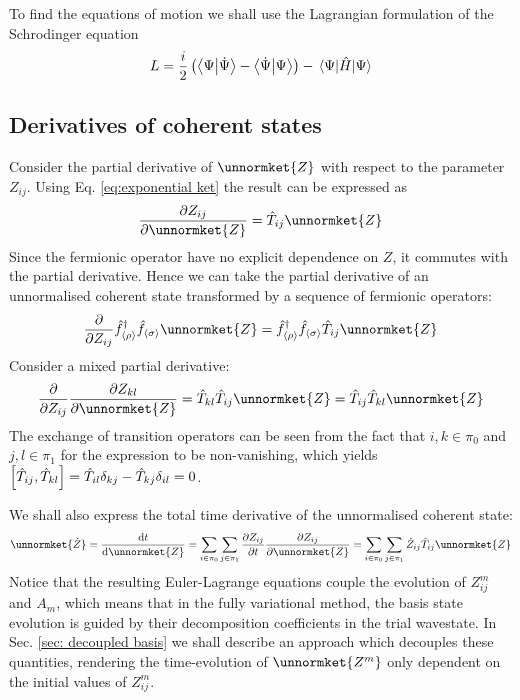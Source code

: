 \documentclass[12pt]{article}
\newcommand{\seq}[1]{\langle #1\rangle}
\newcommand{\hc}{^\dagger}
\begin{document}
	To find the equations of motion we shall use the Lagrangian formulation of the Schrodinger equation
	\begin{equation} \label{eq: schrodinger lagrangian}
	L=\frac{i}{2}\left(\braket{\Psi}{\dot{\Psi}}-\braket{\dot{\Psi}}{\Psi}\right)-\mel{\Psi}{\hat{H}}{\Psi}
	\end{equation}
	
	\subsection{Derivatives of coherent states}
	Consider the partial derivative of $\unnormket{Z}$ with respect to the parameter $Z_{ij}$. Using Eq. \ref{eq:exponential ket} the result can be expressed as
	\begin{equation}
	\pdv{Z_{ij}}\unnormket{Z}=\hat{T}_{ij}\unnormket{Z}
	\end{equation}
	Since the fermionic operator have no explicit dependence on $Z$, it commutes with the partial derivative. Hence we can take the partial derivative of an unnormalised coherent state transformed by a sequence of fermionic operators:
	\begin{equation}
	\pdv{Z_{ij}}\hat{f}\hc_{\seq{\rho}}\hat{f}_{\seq{\sigma}}\unnormket{Z}=\hat{f}\hc_{\seq{\rho}}\hat{f}_{\seq{\sigma}}\hat{T}_{ij}\unnormket{Z}
	\end{equation}
	Consider a mixed partial derivative:
	\begin{equation}
	\pdv{Z_{ij}}\pdv{Z_{kl}}\unnormket{Z}=\hat{T}_{kl}\hat{T}_{ij}\unnormket{Z}=\hat{T}_{ij}\hat{T}_{kl}\unnormket{Z}
	\end{equation}
	 The exchange of transition operators can be seen from the fact that $i,k\in\pi_0$ and $j,l\in\pi_1$ for the expression to be non-vanishing, which yields $\comm{\hat{T}_{ij}}{\hat{T}_{kl}}=\hat{T}_{il}\delta_{kj}-\hat{T}_{kj}\delta_{il}=0$.
	 
	 We shall also express the total time derivative of the unnormalised coherent state:
	 \begin{equation}
	 \unnormket{\dot{Z}}=\dv{t}\unnormket{Z}=\sum_{i\in\pi_0}\sum_{j\in\pi_1}\pdv{Z_{ij}}{t}\pdv{Z_{ij}}\unnormket{Z}=\sum_{i\in\pi_0}\sum_{j\in\pi_1}\dot{Z}_{ij}\hat{T}_{ij}\unnormket{Z}
	 \end{equation}
	 Notice that the resulting Euler-Lagrange equations couple the evolution of $Z^m_{ij}$ and $A_m$, which means that in the fully variational method, the basis state evolution is guided by their decomposition coefficients in the trial wavestate. In Sec. \ref{sec: decoupled basis} we shall describe an approach which decouples these quantities, rendering the time-evolution of $\unnormket{Z^m}$ only dependent on the initial values of $Z^m_{ij}$.
	
\end{document}
